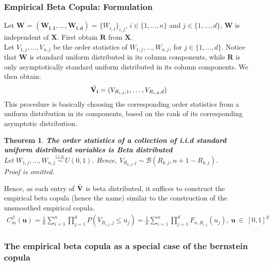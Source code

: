 \documentclass[12pt]{report}
\newtheorem{theorem}{Theorem}[subsection]
\newcommand{\1}{\mathbf{1}}
\begin{document}
\begin{flushleft}
\subsubsection{Empirical Beta Copula: Formulation}
\vspace{0.5cm}
Let $\textbf{W}$ = $(\boldsymbol{W_{i,1}}, \dots, \boldsymbol{W_{i,d}})$ = $\{W_{i,j}\}_{i,j}$, \: $i \in \{1, \dots, n \}$ and $j \in \{1, \dots, d \}$, $\textbf{W}$ is independent of $\textbf{X}$. First obtain $\textbf{R}$ from $\textbf{X}$.\\
\vspace{0.5cm}
Let $V_{1,j}, \dots, V_{n,j}$ be the order statistics of $W_{1,j}, \dots, W_{n,j}$, for $j \in \{ 1, \dots, d \}$. Notice that $\textbf{W}$ is standard uniform distributed in its column components, while $\textbf{R}$ is only asymptotically standard uniform distributed in its column components. We then obtain:
\begin{align*}
\Hat{\mathbf{V_{i}}} = (V_{R_{i,1},1}, \dots, V_{R_{i,d},d})    
\end{align*}
This procedure is basically choosing the corresponding order statistics from a uniform distribution in its components, based on the rank of its corresponding asymptotic distribution. 

\begin{theorem}\label{OrderStatisticsBeta}
\textbf{The order statistics of a collection of i.i.d standard uniform distributed variables is Beta distributed} \\
Let $W_{1,j}, \dots, W_{n,j} \overset{\text{i.i.d.}}{\sim} U(0,1)$. Hence, $V_{R_{k,j},j} \sim \mathcal{B}(R_{k,j}, n + 1 - R_{k,j})$. \\
Proof is omitted.
\end{theorem}

\newpage
Hence, as each entry of $\Hat{\mathbf{V}}$ is beta distributed, it suffices to construct the empirical beta copula (hence the name) similar to the construction of the unsmoothed empirical copula.
\begin{align*}
C^{\beta}_{m}(\textbf{u}) = \frac{1}{n} \sum\limits_{i = 1}^{n} \prod\limits_{j = 1}^{d} P(V_{R_{i,j},j} \le u_{j}) = \frac{1}{n} \sum\limits_{i = 1}^{n} \prod\limits_{j = 1}^{d} F_{n,R_{i,j}}(u_{j}), \: \textbf{u} \: \in \: [0,1]^{d}
\end{align*}

\subsubsection{The empirical beta copula as a special case of the bernstein copula}
\vspace{0.5cm}


\end{flushleft}
\end{document}

